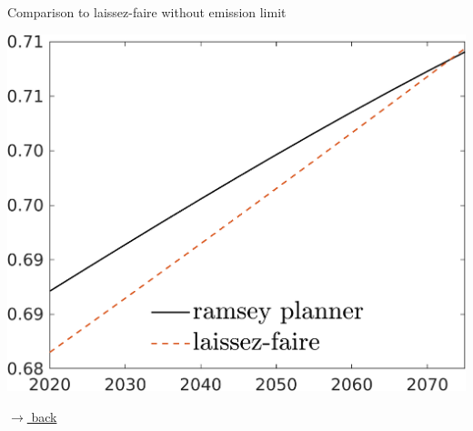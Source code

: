 \documentclass[11pt,aspectratio=169]{beamer}
\begin{document}
\begin{frame}{Comparison to laissez-faire without emission limit}
\begin{minipage}[]{0.32\textwidth}
\end{minipage}
\begin{minipage}[]{0.32\textwidth}
	\includegraphics[width=1\textwidth]{../codding_model/own_basedOnFried/optimalPol_elastS_DisuSci/figures/all_1705/S_LFCompOPT_NOT_NoTaus_spillover0_noskill1_sep1_BN0_ineq0_red0_xgrowth0_etaa0.79_lgd1.png}
\end{minipage}
	\vspace{1mm}
\hfill
\hyperlink{backmainres}{\tiny{$\rightarrow$ back}} 
\end{frame}
\end{document}
